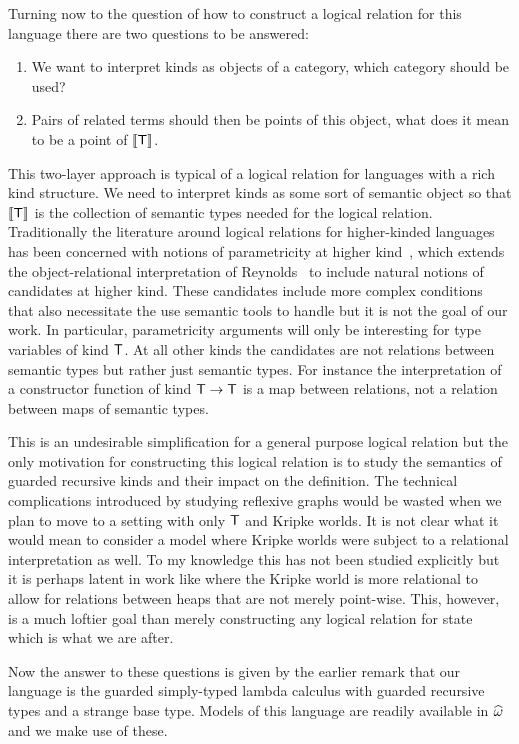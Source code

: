 Turning now to the question of how to construct a logical relation for
this language there are two questions to be answered:
\begin{enumerate}
\item We want to interpret kinds as objects of a category, which
  category should be used?
\item Pairs of related terms should then be points of this object,
  what does it mean to be a point of $\llbracket \mathsf{T} \rrbracket$.
\end{enumerate}
This two-layer approach is typical of a logical relation for languages
with a rich kind structure. We need to interpret kinds as some sort of
semantic object so that $\llbracket \mathsf{T} \rrbracket$ is the collection of semantic
types needed for the logical relation. Traditionally the literature
around logical relations for higher-kinded languages has been
concerned with notions of parametricity at higher
kind~\citep{Hasegawa:94,Robinson:94,Dunphy:04,Vytiniotis:10,Atkey:12},
which extends the object-relational interpretation of
Reynolds~\citep{Reynolds:83} to include natural
notions of candidates at higher kind. These candidates include more
complex conditions that also necessitate the use semantic tools to
handle but it is not the goal of our work. In particular,
parametricity arguments will only be interesting for type variables of
kind $\mathsf{T}$. At all other kinds the candidates are not relations
between semantic types but rather just semantic types. For instance
the interpretation of a constructor function of kind $\mathsf{T} \to \mathsf{T}$
is a map between relations, not a relation between maps of semantic
types.

This is an undesirable simplification for a general purpose logical
relation but the only motivation for constructing this logical
relation is to study the semantics of guarded recursive kinds and
their impact on the definition. The technical complications introduced
by studying reflexive graphs would be wasted when we plan to move to a
setting with only $\mathsf{T}$ and Kripke worlds. It is not clear what it
would mean to consider a model where Kripke worlds were subject to a
relational interpretation as well. To my knowledge this has not been
studied explicitly but it is perhaps latent in work like
\citet{Dreyer:10} where the Kripke world is more relational to allow
for relations between heaps that are not merely point-wise. This,
however, is a much loftier goal than merely constructing any logical
relation for state which is what we are after.

Now the answer to these questions is given by the earlier remark that
our language is the guarded simply-typed lambda calculus with guarded
recursive types and a strange base type. Models of this language are
readily available in $\widehat{\omega}$~\citep{Birkedal:guarded:10,Birkedal:steps:11} and we
make use of these.

